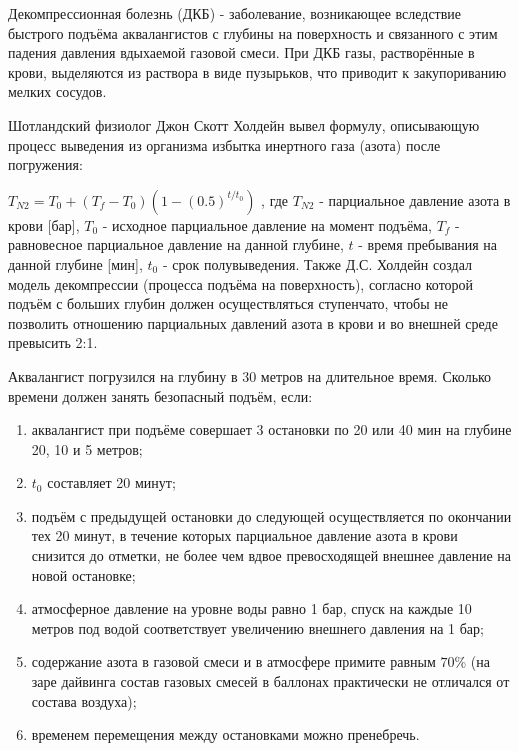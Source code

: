 
Декомпрессионная
болезнь (ДКБ) - заболевание, возникающее вследствие быстрого подъёма
аквалангистов с глубины на поверхность и связанного с этим падения давления
вдыхаемой газовой смеси. При ДКБ газы, растворённые в крови, выделяются из
раствора в виде пузырьков, что приводит к закупориванию мелких сосудов.

Шотландский
физиолог Джон Скотт Холдейн вывел формулу, описывающую процесс выведения из
организма избытка инертного газа (азота) после погружения:

$T_{N2}= T_0 + (T_f - T_0)(1-(0.5)^{t/t_0})$ ,
где $T_{N2}$  - парциальное давление азота в крови [бар], $T_0$ -
исходное парциальное давление на момент подъёма, $T_f$  - равновесное
парциальное давление на данной глубине, $t$  - время пребывания на данной глубине
[мин], $t_0$  - срок полувыведения. Также Д.С. Холдейн создал модель
декомпрессии (процесса подъёма на поверхность), согласно которой подъём с
больших глубин должен осуществляться ступенчато, чтобы не позволить отношению
парциальных давлений азота в крови и во внешней среде превысить 2:1.

Аквалангист
погрузился на глубину в 30 метров на длительное время. Сколько времени должен
занять безопасный подъём, если:

\begin{enumerate}
    \item аквалангист при подъёме совершает 3 остановки по 20 или 40 мин на глубине 20, 10 и 5 метров; 
    \item $t_0$ составляет 20 минут;
    \item подъём с предыдущей остановки до следующей осуществляется по окончании тех 20 минут, в течение которых парциальное давление азота в крови снизится до
отметки, не более чем вдвое превосходящей внешнее давление на новой остановке;
    \item атмосферное давление на уровне воды равно 1 бар, спуск на каждые 10 метров под водой
соответствует увеличению внешнего давления на 1 бар;
    \item содержание азота в газовой смеси и в атмосфере примите равным $70\%$ (на заре
дайвинга состав газовых смесей в баллонах практически не отличался от состава
воздуха);
    \item временем перемещения между остановками можно пренебречь.
\end{enumerate}




